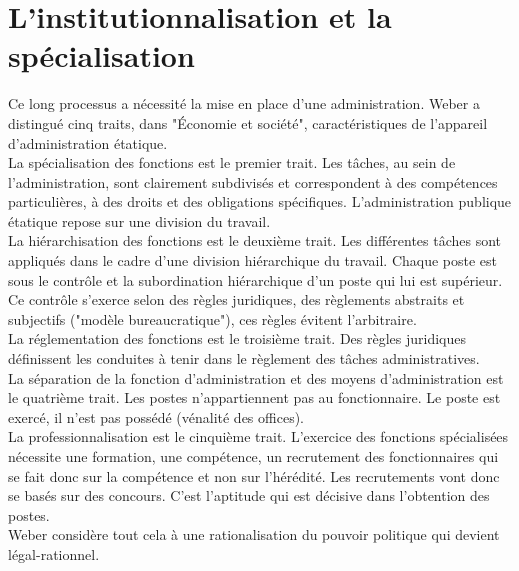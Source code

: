 \documentclass[10pt, a4paper, openany]{book}
\begin{document}
\section{L'institutionnalisation et la spécialisation}

Ce long processus a nécessité la mise en place d'une administration. Weber a distingué cinq traits, dans "Économie et société", caractéristiques de l'appareil d'administration étatique. \\
La spécialisation des fonctions est le premier trait. Les tâches, au sein de l'administration, sont clairement subdivisés et correspondent à des compétences particulières, à des droits et des obligations spécifiques. L'administration publique étatique repose sur une division du travail. \\
La hiérarchisation des fonctions est le deuxième trait. Les différentes tâches sont appliqués dans le cadre d'une division hiérarchique du travail. Chaque poste est sous le contrôle et la subordination hiérarchique d'un poste qui lui est supérieur. Ce contrôle s'exerce selon des règles juridiques, des règlements abstraits et subjectifs ("modèle bureaucratique"), ces règles évitent l'arbitraire. \\ 
La réglementation des fonctions est le troisième trait. Des règles juridiques définissent les conduites à tenir dans le règlement des tâches administratives. \\
La séparation de la fonction d'administration et des moyens d'administration est le quatrième trait. Les postes n'appartiennent pas au fonctionnaire. Le poste est exercé, il n'est pas possédé (vénalité des offices). \\
La professionnalisation est le cinquième trait. L'exercice des fonctions spécialisées nécessite une formation, une compétence, un recrutement des fonctionnaires qui se fait donc sur la compétence et non sur l'hérédité. Les recrutements vont donc se basés sur des concours. C'est l'aptitude qui est décisive dans l'obtention des postes. \\
Weber considère tout cela à une rationalisation du pouvoir politique qui devient légal-rationnel. 
\end{document}

